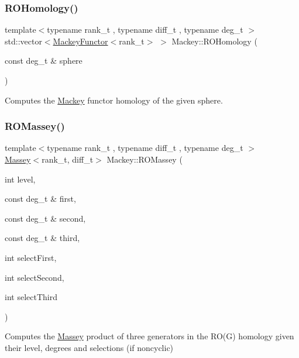 \subsubsection{\texorpdfstring{R\+O\+Homology()}{ROHomology()}}
{\footnotesize\ttfamily template$<$typename rank\+\_\+t , typename diff\+\_\+t , typename deg\+\_\+t $>$ \\
std\+::vector$<$\hyperlink{classMackey_1_1MackeyFunctor}{Mackey\+Functor}$<$rank\+\_\+t$>$ $>$ Mackey\+::\+R\+O\+Homology (\begin{DoxyParamCaption}\item[{const deg\+\_\+t \&}]{sphere }\end{DoxyParamCaption})}



Computes the \hyperlink{namespaceMackey}{Mackey} functor homology of the given sphere. 

\mbox{\label{namespaceMackey_ab75d7bcfa2d92d01bea0d5eef9f48398}} 
\subsubsection{\texorpdfstring{R\+O\+Massey()}{ROMassey()}\hspace{0.1cm}{\footnotesize\ttfamily [1/2]}}
{\footnotesize\ttfamily template$<$typename rank\+\_\+t , typename diff\+\_\+t , typename deg\+\_\+t $>$ \\
\hyperlink{classMackey_1_1Massey}{Massey}$<$rank\+\_\+t, diff\+\_\+t$>$ Mackey\+::\+R\+O\+Massey (\begin{DoxyParamCaption}\item[{int}]{level,  }\item[{const deg\+\_\+t \&}]{first,  }\item[{const deg\+\_\+t \&}]{second,  }\item[{const deg\+\_\+t \&}]{third,  }\item[{int}]{select\+First,  }\item[{int}]{select\+Second,  }\item[{int}]{select\+Third }\end{DoxyParamCaption})}



Computes the \hyperlink{classMackey_1_1Massey}{Massey} product of three generators in the R\+O(\+G) homology given their level, degrees and selections (if noncyclic) 

